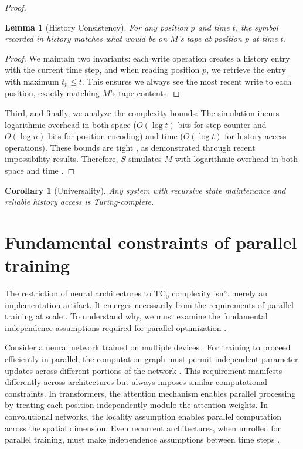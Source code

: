 \documentclass[12pt]{article}
\newtheorem{lemma}[theorem]{Lemma}
\newtheorem{corollary}[theorem]{Corollary}
\begin{document}
\begin{proof}
\begin{lemma}[History Consistency]
For any position $p$ and time $t$, the symbol recorded in history matches what would be on $M$'s tape at position $p$ at time $t$.
\end{lemma}

\begin{proof}
We maintain two invariants: each write operation creates a history entry with the current time step, and when reading position $p$, we retrieve the entry with maximum $t_p \leq t$.
This ensures we always see the most recent write to each position, exactly matching $M$'s tape contents.
\end{proof}

\vspace{0.5em}
\noindent\underline{Third, and finally}, we analyze the complexity bounds: The simulation incurs logarithmic overhead in both space ($O(\log t)$ bits for step counter and $O(\log n)$ bits for position encoding) and time ($O(\log t)$ for history access operations). These bounds are tight \cite{parzych2024memory,hhan2024new,boyle2024memory}, as demonstrated through recent impossibility results. Therefore, $S$ simulates $M$ with logarithmic overhead in both space and time \cite{savage1994space,vonkorff2019molecular,bennett1989time}.
\end{proof}

\begin{corollary}[Universality]
Any system with recursive state maintenance and reliable history access is Turing-complete.
\end{corollary}

\section{Fundamental constraints of parallel training}

The restriction of neural architectures to $\text{TC}_0$ complexity isn't merely an implementation artifact.
It emerges necessarily from the requirements of parallel training at scale \cite{merrill2023parallelism,peng2024limitations}.
To understand why, we must examine the fundamental independence assumptions required for parallel optimization \cite{shallue2019measuring}.

Consider a neural network trained on multiple devices \cite{zhao2024epha}.
For training to proceed efficiently in parallel, the computation graph must permit independent parameter updates across different portions of the network \cite{barrett2019analyzing}.
This requirement manifests differently across architectures but always imposes similar computational constraints.
In transformers, the attention mechanism enables parallel processing by treating each position independently modulo the attention weights.
In convolutional networks, the locality assumption enables parallel computation across the spatial dimension.
Even recurrent architectures, when unrolled for parallel training, must make independence assumptions between time steps \cite{dickson2023rnns}.
\end{document}
